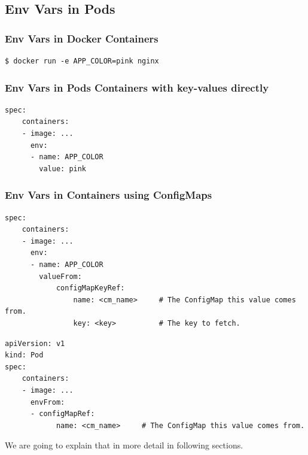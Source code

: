 \documentclass{article}
\newenvironment{codetemplate}[1][]{%
  \mybasecolorbox[#1]
  \itshape
}{%
  \endmybasecolorbox
}
\begin{document}
\subsection{Env Vars in Pods}

\subsubsection{Env Vars in Docker Containers}
\begin{codetemplate}{}
\begin{verbatim}
$ docker run -e APP_COLOR=pink nginx
\end{verbatim}
\end{codetemplate}

\subsubsection{Env Vars in Pods Containers with key-values directly}
\begin{codetemplate}{}
\begin{verbatim}
spec:
    containers:
    - image: ...
      env:
      - name: APP_COLOR
        value: pink
\end{verbatim}
\end{codetemplate}

\subsubsection{Env Vars in  Containers using ConfigMaps}
\begin{codetemplate}{}
\begin{verbatim}
spec:
    containers:
    - image: ...
      env:
      - name: APP_COLOR
        valueFrom:
            configMapKeyRef:
                name: <cm_name>     # The ConfigMap this value comes from.
                key: <key>          # The key to fetch.
\end{verbatim}
\end{codetemplate}

\begin{codetemplate}{}
\begin{verbatim}
apiVersion: v1
kind: Pod
spec:
    containers:
    - image: ...
      envFrom:
      - configMapRef:
            name: <cm_name>     # The ConfigMap this value comes from.
\end{verbatim}
\end{codetemplate}

We are going to explain that in more detail in following sections.
\end{document}
